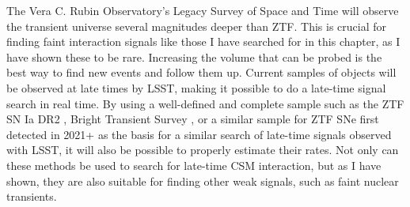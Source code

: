 \documentclass[a4paper,oneside,12pt, class=Latex/Classes/PhDthesisPSnPDF, crop=false]{standalone}
\begin{document}
The Vera C. Rubin Observatory's Legacy Survey of Space and Time \cite[LSST;][]{LSST} will observe the transient universe several magnitudes deeper than ZTF. This is crucial for finding faint interaction signals like those I have searched for in this chapter, as I have shown these to be rare. Increasing the volume that can be probed is the best way to find new events and follow them up. Current samples of objects will be observed at late times by LSST, making it possible to do a late-time signal search in real time. By using a well-defined and complete sample such as the ZTF SN Ia DR2 \citep[][, Smith et al.,~in prep.]{DR2_Overview}, Bright Transient Survey \cite[BTS;][]{BTS_I, BTS_II}, or a similar sample for ZTF SNe first detected in 2021+ as the basis for a similar search of late-time signals observed with LSST, it will also be possible to properly estimate their rates. Not only can these methods be used to search for late-time CSM interaction, but as I have shown, they are also suitable for finding other weak signals, such as faint nuclear transients.
\end{document}
